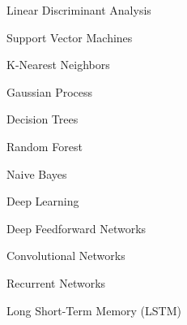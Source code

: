 \documentclass[11pt]{article}
\begin{document}
\begin{enumerate}
\begin{item}
\begin{enumerate}
\begin{item}
\begin{enumerate}
                \begin{item}
                  Linear Discriminant Analysis
                \end{item}

                \begin{item}
                  Support Vector Machines
                \end{item}

                \begin{item}
                  K-Nearest Neighbors
                \end{item}

                \begin{item}
                  Gaussian Process
                \end{item}

                \begin{item}
                  Decision Trees
                \end{item}

                \begin{item}
                  Random Forest
                \end{item}

                \begin{item}
                  Naive Bayes
                \end{item}

                \begin{item}

                  Deep Learning

                  \begin{enumerate}

                      \begin{item}
                        Deep Feedforward Networks
                      \end{item}

                      \begin{item}
                        Convolutional Networks
                      \end{item}

                      \begin{item}
                        Recurrent Networks
                      \end{item}

                      \begin{item}
                        Long Short-Term Memory (LSTM)
                      \end{item}


\end{enumerate}
\end{item}
\end{enumerate}
\end{item}
\end{enumerate}
\end{item}
\end{enumerate}
\end{document}
